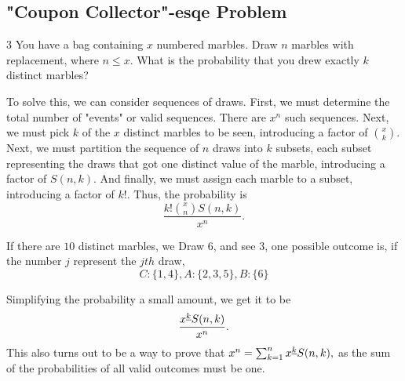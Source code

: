 \subsection{"Coupon Collector"-esqe Problem}
\begin{problem}
	3 You have a bag containing $x$ numbered marbles. Draw $n$ marbles with replacement, where $n\leq x$. What is the probability that you drew exactly $k$ distinct marbles?
\end{problem}
\begin{solution}
To solve this, we can consider sequences of draws. First, we must determine the total number of "events" or valid sequences. There are $x^n$ such sequences. Next, we must pick $k$ of the $x$ distinct marbles to be seen, introducing a factor of ${x\choose k}.$ Next, we must partition the sequence of $n$ draws into $k$ subsets, each subset representing the draws that got one distinct value of the marble, introducing a factor of $S(n,k)$. And finally, we must assign each marble to a subset, introducing a factor of $k!.$ Thus, the probability is \[\frac{k!{x \choose n}S(n,k)}{x^n}.\]
\begin{example}
		If there are $10$ distinct marbles, we Draw $6$, and see $3$, one possible outcome is, if the number $j$ represent the $jth$ draw, \[C:\{1,4\},A:\{2,3,5\},B:\{6\}\]
		
\end{example}
Simplifying the probability a small amount, we get it to be \[\frac{x^{\underline{k}}S(n,k)}{x^n}.\]
This also turns out to be a way to prove that $x^n=\sum_{k=1}^{n}x^{\underline{k}}S(n,k),$ as the sum of the probabilities of all valid outcomes must be one.
\end{solution}
% 
